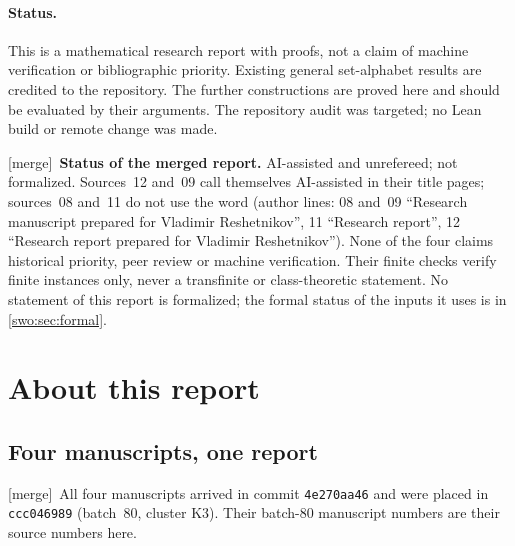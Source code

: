 \documentclass[11pt]{article}
\theoremstyle{definition}
\theoremstyle{remark}
\newcommand{\code}[1]{\texttt{\small #1}}
\newcommand{\merge}{\textsf{[merge]}}
\begin{document}
\begin{resultbox}

\paragraph{Status.}
This is a mathematical research report with proofs, not a claim of
machine verification or bibliographic priority. Existing general
set-alphabet results are credited to the repository. The further
constructions are proved here and should be evaluated by their arguments.
The repository audit was targeted; no Lean build or remote change was made.


\smallskip
\merge\ \textbf{Status of the merged report.} AI-assisted and unrefereed;
not formalized. Sources~12 and~09 call themselves AI-assisted in their title
pages; sources~08 and~11 do not use the word (author lines: 08 and~09
``Research manuscript prepared for Vladimir Reshetnikov'', 11 ``Research
report'', 12 ``Research report prepared for Vladimir Reshetnikov''). None of
the four claims historical priority, peer review or machine verification.
Their finite checks verify finite instances only, never a transfinite or
class-theoretic statement. No statement of this report is formalized; the
formal status of the inputs it uses is in \cref{swo:sec:formal}.
\end{resultbox}

\clearpage
\tableofcontents
\clearpage

\section{About this report}\label{swo:sec:about}

\subsection{Four manuscripts, one report}\label{swo:sub:sources}

\merge\ All four manuscripts arrived in commit \code{4e270aa46} and were placed
in \code{ccc046989} (batch~80, cluster K3). Their batch-80 manuscript numbers
are their source numbers here.
\end{document}
